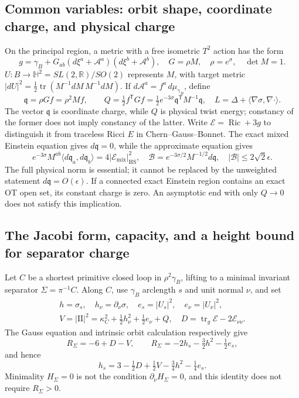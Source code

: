 \documentclass[a4paper,11pt]{article}
\numberwithin{equation}{section}
\theoremstyle{definition}
\newcommand{\Ric}{\operatorname{Ric}}
\newcommand{\tr}{\operatorname{tr}}
\newcommand{\R}{\mathbb R}
\begin{document}
\subsection{Common variables: orbit shape, coordinate charge, and physical charge}
On the principal region, a metric with a free isometric $T^2$ action has the form
\[
 g=\gamma_B+G_{ab}(d\xi^a+\mathcal A^a)(d\xi^b+\mathcal A^b),
 \quad G=\rho M,\quad\rho=e^\sigma,\quad\det M=1.
\]
$U:B\to\mathbb H^2=SL(2,\R)/SO(2)$ represents $M$, with target metric
$|dU|^2=\tfrac12\tr(M^{-1}dM\,M^{-1}dM)$.
If $d\mathcal A^a=f^a\,d\mu_{\gamma_B}$, define
\begin{equation}\label{eq:charged-dictionary}
 \mathfrak q=\rho Gf=\rho^2Mf,\qquad
 Q=\tfrac12 f^{\mathsf T}Gf
   =\tfrac12 e^{-3\sigma}\mathfrak q^{\mathsf T}M^{-1}\mathfrak q,
 \quad L=\Delta+\langle\nabla\sigma,\nabla\cdot\rangle.
\end{equation}
The vector $\mathfrak q$ is coordinate charge, while $Q$ is physical twist energy; constancy of the former does not imply constancy of the latter.
Write $\mathcal E=\Ric+3g$ to distinguish it from traceless Ricci $E$ in Chern--Gauss--Bonnet.
The exact mixed Einstein equation gives $d\mathfrak q=0$, while the approximate equation gives
\begin{equation}\label{eq:physical-charge-source}
 e^{-3\sigma}M^{ab}\langle d\mathfrak q_a,d\mathfrak q_b\rangle
 =4|\mathcal E_{\mathrm{mix}}|_{\mathrm{HS}}^2,
 \quad
 \mathscr B=e^{-3\sigma/2}M^{-1/2}d\mathfrak q,
 \quad |\mathscr B|\le2\sqrt2\epsilon.
\end{equation}
The full physical norm is essential; it cannot be replaced by the unweighted statement $d\mathfrak q=O(\epsilon)$.
If a connected exact Einstein region contains an exact OT open set, its constant charge is zero.
An asymptotic end with only $Q\to0$ does not satisfy this implication.

\subsection{The Jacobi form, capacity, and a height bound for separator charge}
Let $C$ be a shortest primitive closed loop in $\rho^2\gamma_B$, lifting to a minimal invariant separator $\Sigma=\pi^{-1}C$.
Along $C$, use $\gamma_B$ arclength $s$ and unit normal $\nu$, and set
\[
 \begin{gathered}
 h=\sigma_s,\quad h_\nu=\partial_\nu\sigma,\quad
 e_s=|U_s|^2,\quad e_\nu=|U_\nu|^2,\\
 V=|\mathrm{II}|^2=\kappa_C^2+\tfrac12h_\nu^2+\tfrac12e_\nu+Q,
 \quad D=\tr_g\mathcal E-2\mathcal E_{\nu\nu}.
 \end{gathered}
\]
The Gauss equation and intrinsic orbit calculation respectively give
\[
 R_\Sigma=-6+D-V,
 \qquad R_\Sigma=-2h_s-\tfrac32h^2-\tfrac12e_s,
\]
and hence
\begin{equation}\label{eq:separator-h-identity}
 h_s=3-\tfrac12D+\tfrac12V-\tfrac34h^2-\tfrac14e_s.
\end{equation}
Minimality $H_\Sigma=0$ is not the condition $\partial_\nu H_\Sigma=0$, and this identity does not require $R_\Sigma>0$.
\end{document}
